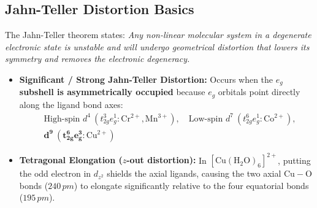 \documentclass[10pt,twoside,openright]{book}
\begin{document}
\subsection{Jahn-Teller Distortion Basics}
The Jahn-Teller theorem states: \textit{Any non-linear molecular system in a degenerate electronic state is unstable and will undergo geometrical distortion that lowers its symmetry and removes the electronic degeneracy.}
\begin{itemize}
  \item \textbf{Significant / Strong Jahn-Teller Distortion:} Occurs when the \textbf{$e_g$ subshell is asymmetrically occupied} because $e_g$ orbitals point directly along the ligand bond axes:
  \begin{align}
    &\text{High-spin } d^4\ (t_{2g}^3 e_g^1: \mathrm{Cr^{2+}, Mn^{3+}}), \quad \text{Low-spin } d^7\ (t_{2g}^6 e_g^1: \mathrm{Co^{2+}}), \\
    &\mathbf{d^9\ (t_{2g}^6 e_g^3: \mathrm{Cu^{2+}})}
  \end{align}
  \item \textbf{Tetragonal Elongation ($z$-out distortion):}
  In $[\mathrm{Cu(H_2O)_6}]^{2+}$, putting the odd electron in $d_{z^2}$ shields the axial ligands, causing the two axial $\mathrm{Cu-O}$ bonds ($240\,\si{pm}$) to elongate significantly relative to the four equatorial bonds ($195\,\si{pm}$).
\end{itemize}
\end{document}
